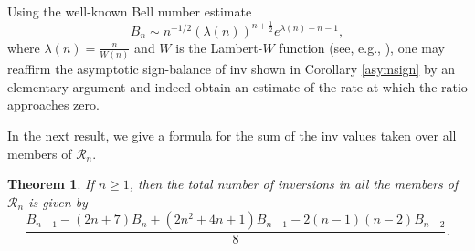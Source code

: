 \documentclass[11pt,a4paper]{article}
\newtheorem{theorem}{Theorem}[section]
\begin{document}
Using the well-known Bell number estimate
$$B_n \sim n^{-1/2}(\lambda(n))^{n+\frac{1}{2}}e^{\lambda(n)-n-1},$$
where $\lambda(n)=\frac{n}{W(n)}$ and $W$ is the Lambert-$W$ function (see, e.g., \cite[p.\,17]{Lo}), one may reaffirm the asymptotic sign-balance of inv shown in Corollary \ref{asymsign} by an elementary argument and  indeed obtain an estimate of the rate at which the ratio approaches zero.

In the next result, we give a formula for the sum of the inv values taken over all members of $\mathcal{R}_n$.

\begin{theorem}\label{totinv}
If $n \geq 1$, then the total number of inversions in all the members of $\mathcal{R}_n$ is given by
\[
\frac{
B_{n+1}
-(2n+7)B_{n}
+(2n^2+4n+1)B_{n-1}
-2(n-1)(n-2)B_{n-2}
}
{8}.
\]
\end{theorem}
\end{document}
